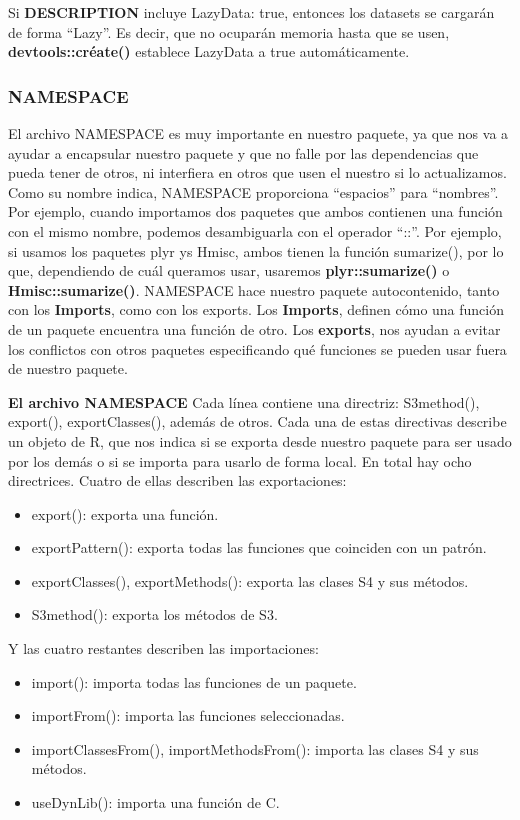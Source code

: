 Si \textbf{DESCRIPTION} incluye LazyData: true, entonces los datasets se cargar\'an de forma
“Lazy”. Es decir, que no ocupar\'an memoria hasta que se usen, \textbf{devtools::cr\'eate()} establece
LazyData a true autom\'aticamente.

\subsubsection{NAMESPACE}

El archivo NAMESPACE es muy importante en nuestro paquete, ya que nos va a ayudar a
encapsular nuestro paquete y que no falle por las dependencias que pueda tener de otros, ni
interfiera en otros que usen el nuestro si lo actualizamos.
Como su nombre indica, NAMESPACE proporciona “espacios” para “nombres”. Por ejemplo,
cuando importamos dos paquetes que ambos contienen una funci\'on con el mismo nombre,
podemos desambiguarla con el operador “::”. Por ejemplo, si usamos los paquetes plyr ys
Hmisc, ambos tienen la funci\'on sumarize(), por lo que, dependiendo de cu\'al queramos usar,
usaremos \textbf{plyr::sumarize()} o \textbf{Hmisc::sumarize()}.
NAMESPACE hace nuestro paquete autocontenido, tanto con los \textbf{Imports}, como con los
exports. Los \textbf{Imports}, definen c\'omo una funci\'on de un paquete encuentra una funci\'on de
otro. Los \textbf{exports}, nos ayudan a evitar los conflictos con otros paquetes especificando qu\'e
funciones se pueden usar fuera de nuestro paquete.

\textbf{El archivo NAMESPACE}
Cada l\'inea contiene una directriz: S3method(), export(), exportClasses(), adem\'as de otros.
Cada una de estas directivas describe un objeto de R, que nos indica si se exporta desde
nuestro paquete para ser usado por los dem\'as o si se importa para usarlo de forma local.
En total hay ocho directrices. Cuatro de ellas describen las exportaciones:

\begin{itemize}
    \item export(): exporta una funci\'on.
    \item exportPattern(): exporta todas las funciones que coinciden con un patr\'on.
    \item exportClasses(), exportMethods(): exporta las clases S4 y sus m\'etodos.
    \item S3method(): exporta los m\'etodos de S3.
\end{itemize}

Y las cuatro restantes describen las importaciones:
\begin{itemize}
    \item import(): importa todas las funciones de un paquete.
    \item importFrom(): importa las funciones seleccionadas.
    \item importClassesFrom(), importMethodsFrom(): importa las clases S4 y sus
m\'etodos.
    \item useDynLib(): importa una funci\'on de C.
\end{itemize}

